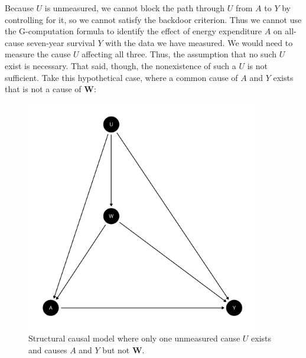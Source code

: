 \documentclass{article}\usepackage[]{graphicx}\usepackage[]{xcolor}
\makeatletter
\newenvironment{kframe}{%
 \def\at@end@of@kframe{}%
 \ifinner\ifhmode%
  \def\at@end@of@kframe{\end{minipage}}%
  \begin{minipage}{\columnwidth}%
 \fi\fi%
 \def\FrameCommand##1{\hskip\@totalleftmargin \hskip-\fboxsep
 \colorbox{shadecolor}{##1}\hskip-\fboxsep
     \hskip-\linewidth \hskip-\@totalleftmargin \hskip\columnwidth}%
 \MakeFramed {\advance\hsize-\width
   \@totalleftmargin\z@ \linewidth\hsize
   \@setminipage}}%
 {\par\unskip\endMakeFramed%
 \at@end@of@kframe}
\newenvironment{knitrout}{}{} %
\makeatother
\begin{document}
Because $U$ is unmeasured, we cannot block the path through $U$ from $A$ to $Y$ by controlling for it, so we cannot satisfy the backdoor criterion. Thus we cannot use the G-computation formula to identify the effect of energy expenditure $A$ on all-cause seven-year survival $Y$ with the data we have measured. We would need to measure the cause $U$ affecting all three. Thus, the assumption that no such $U$ exist is necessary. That said, though, the nonexistence of such a $U$ is not sufficient. Take this hypothetical case, where a common cause of $A$ and $Y$ exists that is not a cause of $\bm{W}$:

\begin{figure}
  \caption{Structural causal model where only one unmeasured cause $U$ exists and causes $A$ and $Y$ but not $\bm{W}$.}
  \centering

\begin{knitrout}
\color{fgcolor}\begin{kframe}


{\ttfamily\noindent\bfseries{}}\end{kframe}
\includegraphics[width=4in]{figure/unnamed-chunk-7-1} 

\end{knitrout}

\end{figure}
\end{document}
